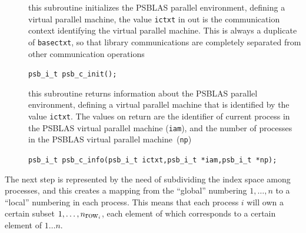 \documentclass[twoside,a4paper]{refart}
\theoremstyle{definition}
\begin{document}
\begin{description}
	\item[] this subroutine initializes the PSBLAS parallel environment, defining a virtual parallel machine, the value \texttt{ictxt} in out is the communication context identifying the virtual parallel machine.
	This is always a duplicate of \texttt{basectxt}, so that library communications are completely separated from other communication operations
	
	 \lstinline[style=CStyle]|psb_i_t psb_c_init();|
	
	\item[] this subroutine returns information about the PSBLAS parallel environment, defining a virtual parallel machine that is identified by the value \texttt{ictxt}. The values on return are the identifier of current process in the PSBLAS virtual parallel machine (\texttt{iam}), and the number of processes in the PSBLAS virtual parallel machine~(\texttt{np})
	
	 \lstinline[style=CStyle]|psb_i_t psb_c_info(psb_i_t ictxt,psb_i_t *iam,psb_i_t *np);|
	
\end{description}	
	
	The next step is represented by the need of subdividing the index space among processes, and this creates a mapping from the ``global'' numbering $1,\ldots,n$ to a ``local'' numbering
	in each process. This means that each process $i$ will own a certain subset
	$1,\ldots,n_{\hbox{row}_i}$, each element of which corresponds to a certain element of $1\dots n$.
	
\end{document}
